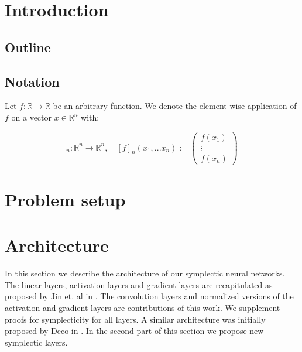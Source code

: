 \documentclass[twoside,a4paper]{article}
\begin{document}
\section{Introduction}


\subsection{Outline}

\subsection{Notation}

Let $ f: \mathbb{R} \rightarrow \mathbb{R} $ be an arbitrary function. We denote
the element-wise application of $f$ on a vector $x \in \mathbb{R}^n$ with:

\begin{equation*}
	[f]_n: \mathbb{R}^n \rightarrow \mathbb{R}^n, \quad 
	[f]_n(x_1, ... x_n) := \begin{pmatrix}
		f(x_1) \\
		\vdots \\
		f(x_n)
	\end{pmatrix}
\end{equation*}


%
%
\newpage
\section{Problem setup}

\section{Architecture}

In this section we describe the architecture of our symplectic neural networks.
The linear layers, activation layers and gradient layers are recapitulated as 
proposed by Jin et. al  in \cite{Jin2020} .
The convolution layers and normalized versions of the activation and gradient layers
are contributions of this work.
We supplement proofs for symplecticity for all layers. 
A similar architecture was initially proposed by Deco in \cite{Deco1995} 
. In the second part of this section 
we propose new symplectic layers.
\end{document}
